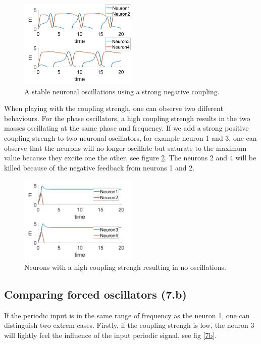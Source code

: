 \documentclass[a4paper]{scrartcl}
\begin{document}
\begin{figure}[!h]
	\centering
	\includegraphics[width=0.5\textwidth]{fig/crazy.png}
	\caption{A stable neuronal oscillations using a strong negative coupling.}\label{crazy}
\end{figure}


When playing with the coupling strengh, one can observe two different behaviours. For the phase oscillators, a high coupling strengh results in the two masses oscillating at the same phase and frequency. If we add a strong positive coupling strengh to two neuronal oscillators, for example neuron 1 and 3, one can observe that the neurons will no longer oscillate but saturate to the maximum value because they excite one the other, see figure \ref{kill}. The neurons 2 and 4 will be killed because of the negative feedback from neurons 1 and 2.

\begin{figure}[!h]
	\centering
	\includegraphics[width=0.5\textwidth]{fig/kill.png}
	\caption{Neurons with a high coupling strengh resulting in no oscillations.}\label{kill}
\end{figure}

\newpage

\subsection{Comparing forced oscillators (7.b)}

If the periodic input is in the same range of frequency as the neuron 1, one can distinguish two extrem cases. Firstly, if the coupling strengh is low, the neuron 3 will lightly feel the influence of the input periodic signal, see fig \ref{7b}.
\end{document}

